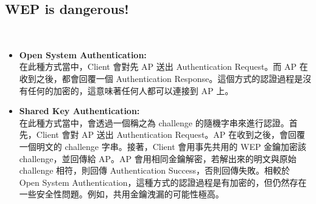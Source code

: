 \documentclass[12pt]{article}
\newenvironment{problem}[2][Problem]{\begin{trivlist}
\item[\hskip \labelsep {\bfseries #1}\hskip \labelsep {\bfseries #2}]}{\end{trivlist}}
\begin{document}
\subsection{WEP is dangerous!}
\begin{problem}{2. }　
  \begin{itemize}
    \item \textbf{Open System Authentication:} \\
          在此種方式當中，Client 會對先 AP 送出 Authentication Request。而 AP 在收到之後，都會回覆一個 Authentication Response。這個方式的認證過程是沒有任何的加密的，這意味著任何人都可以連接到 AP 上。
    \item \textbf{Shared Key Authentication:} \\
          在此種方式當中，會透過一個稱之為 challenge 的隨機字串來進行認證。首先，Client 會對 AP 送出 Authentication Request。AP 在收到之後，會回覆一個明文的 challenge 字串。接著，Client 會用事先共用的 WEP 金鑰加密該 challenge，並回傳給 AP。AP 會用相同金鑰解密，若解出來的明文與原始 challenge 相符，則回傳 Authentication Success，否則回傳失敗。相較於 Open System Authentication，這種方式的認證過程是有加密的，但仍然存在一些安全性問題。例如，共用金鑰洩漏的可能性極高。
  \end{itemize}
\end{problem}
\end{document}
